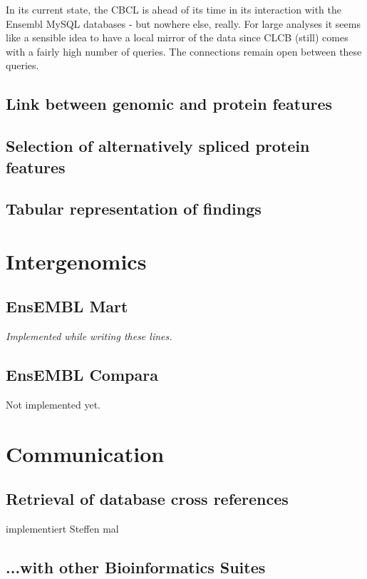 \documentclass{book}
\newcommand\ensembl{EnsEMBL }
\newcommand\CLCB{CLCB }
\begin{document}
In its current state, the CBCL is ahead of its time in its interaction with
the Ensembl MySQL databases - but nowhere else, really. For large analyses
it seems like a sensible idea to have a local mirror of the data since
\CLCB (still) comes with a fairly high number of queries. The connections
remain open between these queries.

\subsection{Link between genomic and protein features}

\subsection{Selection of alternatively spliced protein features}

\subsection{Tabular representation of findings}

\section{Intergenomics}

\subsection{\ensembl Mart}

{\em Implemented while writing these lines.}

\subsection{\ensembl Compara}

Not implemented yet.

\section{Communication}

\subsection{Retrieval of database cross references}

implementiert Steffen mal

\subsection{...with other Bioinformatics Suites}
\end{document}
